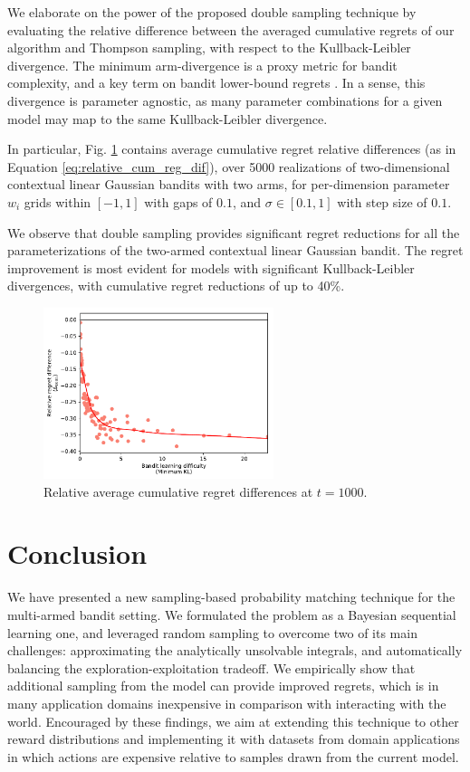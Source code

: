 \documentclass[10pt]{article}
\begin{document}
We elaborate on the power of the proposed double sampling technique by evaluating the relative difference between the averaged cumulative regrets of our algorithm and Thompson sampling, with respect to the Kullback-Leibler divergence. The minimum arm-divergence is a proxy metric for bandit complexity, and a key term on bandit lower-bound regrets \cite{j-Lai1985}. In a sense, this divergence is parameter agnostic, as many parameter combinations for a given model may map to the same Kullback-Leibler divergence.

In particular, Fig. \ref{fig:linearGaussian_relative_cumregret_kl} contains average cumulative regret relative differences (as in Equation \ref{eq:relative_cum_reg_dif}), over 5000 realizations of two-dimensional contextual linear Gaussian bandits with two arms, for per-dimension parameter $w_i$ grids within $[-1,1]$ with gaps of $0.1$, and $\sigma \in [0.1,1]$ with step size of $0.1$.

We observe that double sampling provides significant regret reductions for all the parameterizations of the two-armed contextual linear Gaussian bandit. The regret improvement is most evident for models with significant Kullback-Leibler divergences, with cumulative regret reductions of up to 40\%.

\begin{figure}[!h]
	\centering
	\includegraphics[width=0.6\textwidth]{./figs/linearGaussian/min_KL_relDiff_t1000_07.pdf}
	\caption{Relative average cumulative regret differences at $t=1000$.}
	\label{fig:linearGaussian_relative_cumregret_kl}
\end{figure}

\section{Conclusion}
\label{sec:conclusion}

We have presented a new sampling-based probability matching technique for the multi-armed bandit setting. We formulated the problem as a Bayesian sequential learning one, and leveraged random sampling to overcome two of its main challenges: approximating the analytically unsolvable integrals, and automatically balancing the exploration-exploitation tradeoff. We empirically show that additional sampling from the model can provide improved regrets, which is in many application domains inexpensive in comparison with interacting with the world. Encouraged by these findings, we aim at extending this technique to other reward distributions and implementing it with datasets from domain applications in which actions are expensive relative to samples drawn from the current model.
\end{document}
